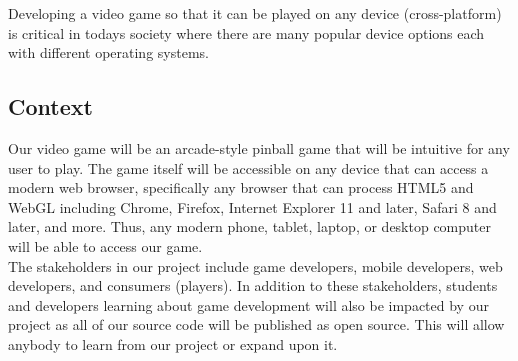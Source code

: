 \documentclass{article}
\begin{document}
Developing a video game so that it can be played on any device (cross-platform) is critical in today\textsc{}s society where there are many popular device options each with different operating systems.



\subsection{Context}

Our video game will be an arcade-style pinball game that will be intuitive for any user to play. The game itself will be accessible on any device that can access a modern web browser, specifically any browser that can process HTML5 and WebGL including Chrome, Firefox, Internet Explorer 11 and later, Safari 8 and later, and more. Thus, any modern phone, tablet, laptop, or desktop computer will be able to access our game.  \\

The stakeholders in our project include game developers, mobile developers, web developers, and consumers (players). In addition to these stakeholders, students and developers learning about game development will also be impacted by our project as all of our source code will be published as open source. This will allow anybody to learn from our project or expand upon it.
\end{document}
